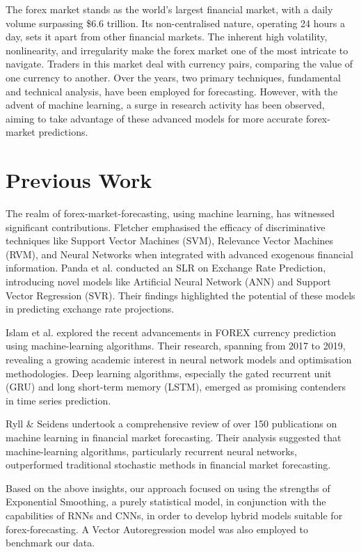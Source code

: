 \documentclass[conference]{IEEEtran}
\begin{document}
The forex market stands as the world's largest financial market, with a daily volume surpassing \$6.6 trillion. Its non-centralised nature, operating 24 hours a day, sets it apart from other financial markets. The inherent high volatility, nonlinearity, and irregularity make the forex market one of the most intricate to navigate\cite{ayitey}. Traders in this market deal with currency pairs, comparing the value of one currency to another. Over the years, two primary techniques, fundamental and technical analysis, have been employed for forecasting. However, with the advent of machine learning, a surge in research activity has been observed, aiming to take advantage of these advanced models for more accurate forex-market predictions.

\section{Previous Work}

The realm of forex-market-forecasting, using machine learning, has witnessed significant contributions. Fletcher\cite{fletcher} emphasised the efficacy of discriminative techniques like Support Vector Machines (SVM), Relevance Vector Machines (RVM), and Neural Networks when integrated with advanced exogenous financial information. Panda et al.\cite{panda} conducted an SLR on Exchange Rate Prediction, introducing novel models like Artificial Neural Network (ANN) and Support Vector Regression (SVR). Their findings highlighted the potential of these models in predicting exchange rate projections.

Islam et al.\cite{islam} explored the recent advancements in FOREX currency prediction using machine-learning algorithms. Their research, spanning from 2017 to 2019, revealing a growing academic interest in neural network models and optimisation methodologies. Deep learning algorithms, especially the gated recurrent unit (GRU) and long short-term memory (LSTM), emerged as promising contenders in time series prediction.

Ryll \& Seidens\cite{ryll} undertook a comprehensive review of over 150 publications on machine learning in financial market forecasting. Their analysis suggested that machine-learning algorithms, particularly recurrent neural networks, outperformed traditional stochastic methods in financial market forecasting.

Based on the above insights, our approach focused on using the strengths of Exponential Smoothing\cite{brown}, a purely statistical model, in conjunction with the capabilities of RNNs and CNNs, in order to develop hybrid models suitable for forex-forecasting. A Vector Autoregression model was also employed to benchmark our data.
\end{document}

